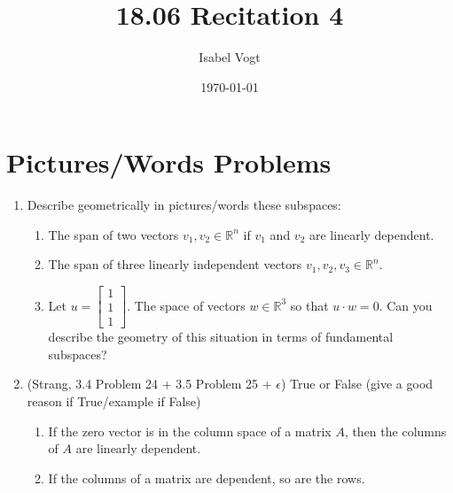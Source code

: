 \documentclass[11pt]{article}
\title{18.06 Recitation 4}
\author{Isabel Vogt}
\date{\today}                                           %
\newcommand{\rr}{\mathbb{R}}
\begin{document}
\maketitle
\section{Pictures/Words Problems}

\begin{enumerate}

\item Describe geometrically in pictures/words these subspaces:

\begin{enumerate}

\item The span of two vectors $v_1, v_2 \in \rr^n$ if $v_1$ and $v_2$ are linearly dependent.

\item The span of three linearly independent vectors $v_1, v_2, v_3 \in \rr^n$.

\item Let $u = \begin{bmatrix} 1 \\ 1 \\ 1 \end{bmatrix}$.  The space of vectors $w \in \rr^3$ so that $u \cdot w = 0$.  Can you describe the geometry of this situation in terms of fundamental subspaces?


\end{enumerate}

\item (Strang, 3.4 Problem 24 + 3.5 Problem 25 + $\epsilon$) True or False (give a good reason if True/example if False)

\begin{enumerate}

\item If the zero vector is in the column space of a matrix $A$, then the columns of $A$ are linearly dependent.

\item If the columns of a matrix are dependent, so are the rows.


\end{enumerate}
\end{enumerate}
\end{document}
